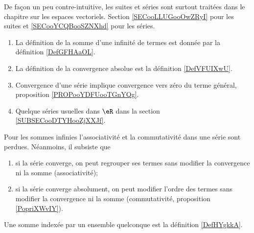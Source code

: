 
De façon un peu contre-intuitive, les suites et séries sont surtout traitées dans le chapitre sur les espaces vectoriels. Section \ref{SECooLLUGooOwZRyI} pour les suites et \ref{SECooYCQBooSZNXhd} pour les séries.

\begin{enumerate}
    \item
        La définition de la somme d'une infinité de termes est donnée par la définition \ref{DefGFHAaOL}.
    \item
        La définition de la convergence absolue est la définition \ref{DefVFUIXwU}.
    \item
        Convergence d'une série implique convergence vers zéro du terme général, proposition \ref{PROPooYDFUooTGnYQg}.
    \item
        Quelque séries usuelles dans \( \eR\) dans la section \ref{SUBSECooDTYHooZjXXJf}.
\end{enumerate}

    Pour les sommes infinies l'associativité et la commutativité dans une série sont perdues. Néanmoins, il subsiste que
  \begin{enumerate}
  \item 
      si la série converge, on peut regrouper ses termes sans modifier la convergence ni la somme (associativité);
  \item
      si la série converge absolument, on peut modifier l'ordre des termes sans modifier la convergence ni la somme (commutativité, proposition \ref{PopriXWvIY}).
  \end{enumerate}

Une somme indexée par un ensemble quelconque est la définition \ref{DefHYgkkA}.

